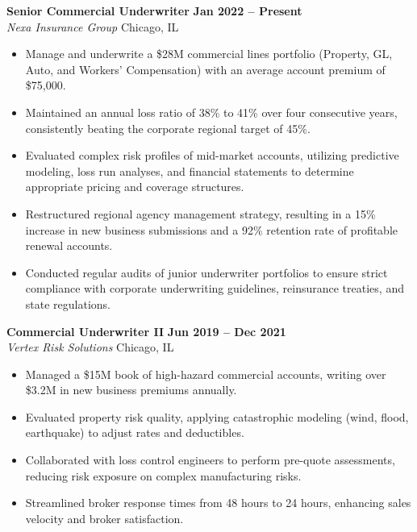 \documentclass[10pt,letterpaper]{article}
\begin{document}
\noindent
\textbf{Senior Commercial Underwriter} \hfill \textbf{Jan 2022 -- Present} \\
\textit{Nexa Insurance Group} \hfill Chicago, IL
\begin{itemize}[topsep=2pt, itemsep=2pt]
    \item Manage and underwrite a \$28M commercial lines portfolio (Property, GL, Auto, and Workers' Compensation) with an average account premium of \$75,000.
    \item Maintained an annual loss ratio of 38\% to 41\% over four consecutive years, consistently beating the corporate regional target of 45\%.
    \item Evaluated complex risk profiles of mid-market accounts, utilizing predictive modeling, loss run analyses, and financial statements to determine appropriate pricing and coverage structures.
    \item Restructured regional agency management strategy, resulting in a 15\% increase in new business submissions and a 92\% retention rate of profitable renewal accounts.
    \item Conducted regular audits of junior underwriter portfolios to ensure strict compliance with corporate underwriting guidelines, reinsurance treaties, and state regulations.
\end{itemize}

\vspace{0.6em}

\noindent
\textbf{Commercial Underwriter II} \hfill \textbf{Jun 2019 -- Dec 2021} \\
\textit{Vertex Risk Solutions} \hfill Chicago, IL
\begin{itemize}[topsep=2pt, itemsep=2pt]
    \item Managed a \$15M book of high-hazard commercial accounts, writing over \$3.2M in new business premiums annually.
    \item Evaluated property risk quality, applying catastrophic modeling (wind, flood, earthquake) to adjust rates and deductibles.
    \item Collaborated with loss control engineers to perform pre-quote assessments, reducing risk exposure on complex manufacturing risks.
    \item Streamlined broker response times from 48 hours to 24 hours, enhancing sales velocity and broker satisfaction.
\end{itemize}

\vspace{0.6em}
\end{document}
